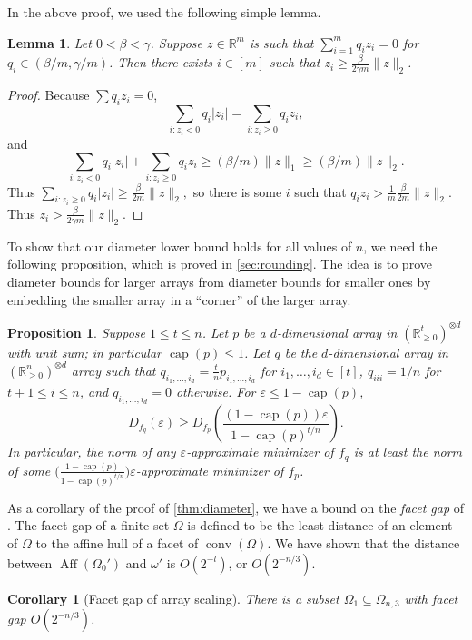 \documentclass[10pt,a4paper]{article}
\newtheorem{lem}[thm]{Lemma}\crefname{lem}{Lemma}{Lemmas}
\newtheorem{cor}[thm]{Corollary}\crefname{cor}{Corollary}{Corollaries}
\newtheorem{prp}[thm]{Proposition}\crefname{prp}{Proposition}{Propositions}
\numberwithin{equation}{section}
\DeclareMathOperator{\aff}{Aff}
\DeclareMathOperator{\conv}{conv}
\DeclareMathOperator{\capa}{cap}
\newcommand{\RR}{\mathbb R}
\newcommand{\ot}{\otimes}
\newcommand{\eps}{\varepsilon}
\begin{document}
In the above proof, we used the following simple lemma.
\begin{lem}\label{lem:simple} Let $0 < \beta < \gamma$. Suppose $z \in \RR^m$ is such that $\sum_{i = 1}^m q_i z_i = 0$ for $q_i \in (\beta/m, \gamma/m)$. Then there exists $i \in [m]$ such that $z_i \geq \frac{\beta }{2\gamma m} \|z\|_2$.
\end{lem}
\begin{proof}
Because $\sum q_i z_i = 0$, 
$$ \sum_{i: z_i < 0} q_i |z_i| = \sum_{i:z_i \geq 0} q_i z_i,$$
and 
$$ \sum_{i: z_i < 0} q_i |z_i| +  \sum_{i:z_i \geq 0} q_i z_i \geq (\beta/m) \|z\|_1 \geq (\beta/m)\|z\|_2.$$
Thus $\sum_{i: z_i \geq 0} q_i |z_i| \geq \frac{\beta}{2m}\|z\|_2,$ so there is some $i$ such that $q_i z_i > \frac{1}{m} \frac{\beta}{2m}\|z\|_2$. Thus $z_i > \frac{\beta}{2\gamma m}\|z\|_2$.
\end{proof}
To show that our diameter lower bound holds for all values of $n$, we need the following proposition, which is proved in \cref{sec:rounding}. The idea is to prove diameter bounds for larger arrays from diameter bounds for smaller ones by embedding the smaller array in a ``corner'' of the larger array.

\begin{prp} \label{prp:pad-diameter}
Suppose $1 \leq t \leq n$. Let $p$ be a $d$-dimensional array in $(\RR_{\geq 0}^t)^{\ot d}$ with unit sum; in particular $\capa(p) \leq 1$. Let $q$ be the $d$-dimensional array in $(\RR_{\geq 0}^n)^{\ot d}$ array such that $q_{i_1, \dots, i_d} = \frac{t}{n} p_{i_1, \dots, i_d}$ for $i_1, \dots, i_d \in [t]$, $q_{iii} = 1/n$ for $t+1 \leq i \leq n$, and $q_{i_1, \dots, i_d} = 0$ otherwise. For $\eps \leq 1 - \capa(p)$, 
$$D_{f_q}(\eps) \geq D_{f_p}\left(\frac{(1 - \capa(p))\eps}{1 - \capa(p)^{t/n}}\right).$$ 
In particular, the norm of any $\eps$-approximate minimizer of $f_q$ is at least the norm of some $\big( \frac{1 - \capa(p)}{1 - \capa(p)^{t/n}} \big) \eps$-approximate minimizer of $f_p$. 
\end{prp}



As a corollary of the proof of \cref{thm:diameter}, we have a bound on the \emph{facet gap} of \cite{burgisser2020interior}. The facet gap of a finite set $\Omega$ is defined to be the least distance of an element of $\Omega$ to the affine hull of a facet of $\conv(\Omega)$. We have shown that the distance between $\aff(\Omega_0')$ and $\omega'$ is $O(2^{-l})$, or $O(2^{- n/3})$. 
\begin{cor}[Facet gap of array scaling] \label{cor:facet-fap}
There is a subset $\Omega_1 \subseteq \Omega_{n,3}$ with facet gap $O(2^{- n/3})$.
\end{cor}
\end{document}
